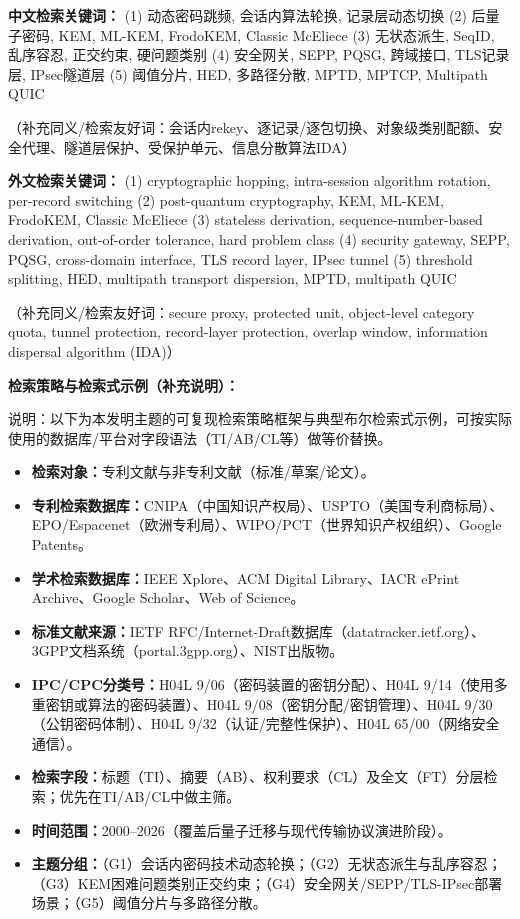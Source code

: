 ﻿\documentclass[12pt,a4paper]{article}
\begin{document}
    \textbf{中文检索关键词：}
(1) 动态密码跳频, 会话内算法轮换, 记录层动态切换
(2) 后量子密码, KEM, ML-KEM, FrodoKEM, Classic McEliece
(3) 无状态派生, SeqID, 乱序容忍, 正交约束, 硬问题类别
(4) 安全网关, SEPP, PQSG, 跨域接口, TLS记录层, IPsec隧道层
(5) 阈值分片, HED, 多路径分散, MPTD, MPTCP, Multipath QUIC

（补充同义/检索友好词：会话内rekey、逐记录/逐包切换、对象级类别配额、安全代理、隧道层保护、受保护单元、信息分散算法IDA）

    \textbf{外文检索关键词：}
(1) cryptographic hopping, intra-session algorithm rotation, per-record switching
(2) post-quantum cryptography, KEM, ML-KEM, FrodoKEM, Classic McEliece
(3) stateless derivation, sequence-number-based derivation, out-of-order tolerance, hard problem class
(4) security gateway, SEPP, PQSG, cross-domain interface, TLS record layer, IPsec tunnel
(5) threshold splitting, HED, multipath transport dispersion, MPTD, multipath QUIC

（补充同义/检索友好词：secure proxy, protected unit, object-level category quota, tunnel protection, record-layer protection, overlap window, information dispersal algorithm (IDA)）

\vspace{0.5em}
\noindent\textbf{检索策略与检索式示例（补充说明）：}

说明：以下为本发明主题的可复现检索策略框架与典型布尔检索式示例，可按实际使用的数据库/平台对字段语法（TI/AB/CL等）做等价替换。

\begin{itemize}[leftmargin=2em]
    \item \textbf{检索对象：}专利文献与非专利文献（标准/草案/论文）。
    \item \textbf{专利检索数据库：}CNIPA（中国知识产权局）、USPTO（美国专利商标局）、EPO/Espacenet（欧洲专利局）、WIPO/PCT（世界知识产权组织）、Google Patents。
    \item \textbf{学术检索数据库：}IEEE Xplore、ACM Digital Library、IACR ePrint Archive、Google Scholar、Web of Science。
    \item \textbf{标准文献来源：}IETF RFC/Internet-Draft数据库（datatracker.ietf.org）、3GPP文档系统（portal.3gpp.org）、NIST出版物。
    \item \textbf{IPC/CPC分类号：}H04L 9/06（密码装置的密钥分配）、H04L 9/14（使用多重密钥或算法的密码装置）、H04L 9/08（密钥分配/密钥管理）、H04L 9/30（公钥密码体制）、H04L 9/32（认证/完整性保护）、H04L 65/00（网络安全通信）。
    \item \textbf{检索字段：}标题（TI）、摘要（AB）、权利要求（CL）及全文（FT）分层检索；优先在TI/AB/CL中做主筛。
    \item \textbf{时间范围：}2000--2026（覆盖后量子迁移与现代传输协议演进阶段）。
    \item \textbf{主题分组：}（G1）会话内密码技术动态轮换；（G2）无状态派生与乱序容忍；（G3）KEM困难问题类别正交约束；（G4）安全网关/SEPP/TLS-IPsec部署场景；（G5）阈值分片与多路径分散。
\end{itemize}
\end{document}
